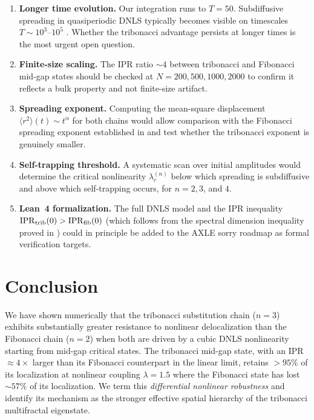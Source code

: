\documentclass[12pt,a4paper]{article}
\begin{document}
\begin{enumerate}

\item \textbf{Longer time evolution.} Our integration runs to $T = 50$.
Subdiffusive spreading in quasiperiodic DNLS typically becomes visible on
timescales $T \sim 10^3$--$10^5$ \cite{Flach2010}. Whether the tribonacci
advantage persists at longer times is the most urgent open question.

\item \textbf{Finite-size scaling.} The IPR ratio $\sim 4$ between tribonacci
and Fibonacci mid-gap states should be checked at $N = 200, 500, 1000, 2000$
to confirm it reflects a bulk property and not finite-size artifact.

\item \textbf{Spreading exponent.} Computing the mean-square displacement
$\langle r^2 \rangle(t) \sim t^{\alpha}$ for both chains would allow
comparison with the Fibonacci spreading exponent established in
\cite{Lahini2009} and test whether the tribonacci exponent is genuinely
smaller.

\item \textbf{Self-trapping threshold.} A systematic scan over initial
amplitudes would determine the critical nonlinearity $\lambda_c^{(n)}$
below which spreading is subdiffusive and above which self-trapping occurs,
for $n = 2, 3$, and $4$.

\item \textbf{Lean~4 formalization.} The full DNLS model and the IPR
inequality $\mathrm{IPR}_{\rm trib}(0) > \mathrm{IPR}_{\rm fib}(0)$
(which follows from the spectral dimension inequality proved in
\cite{Krebbekx2023}) could in principle be added to the AXLE sorry roadmap
as formal verification targets.

\end{enumerate}

\section{Conclusion}

We have shown numerically that the tribonacci substitution chain ($n=3$)
exhibits substantially greater resistance to nonlinear delocalization than the
Fibonacci chain ($n=2$) when both are driven by a cubic DNLS nonlinearity
starting from mid-gap critical states. The tribonacci mid-gap state, with an
IPR $\approx 4\times$ larger than its Fibonacci counterpart in the linear
limit, retains $> 95\%$ of its localization at nonlinear coupling $\lambda =
1.5$ where the Fibonacci state has lost $\sim 57\%$ of its localization. We
term this \emph{differential nonlinear robustness} and identify its mechanism
as the stronger effective spatial hierarchy of the tribonacci multifractal
eigenstate.
\end{document}
